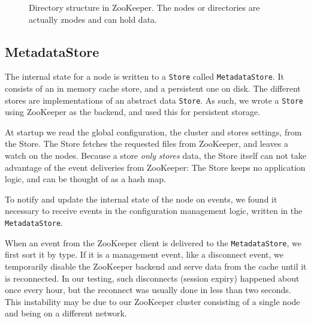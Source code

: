\begin{figure}[h]
\caption{Directory structure in ZooKeeper. The nodes or directories are actually znodes and can hold data.}
\label{fig:dirstruct}
\end{figure}

\subsection{MetadataStore}
The internal state for a node is written to a \texttt{Store} called \texttt{MetadataStore}. It consists of an in memory cache store, and a persistent one on disk. The different stores are implementations of an abstract data \texttt{Store}. As such, we wrote a \texttt{Store} using ZooKeeper as the backend, and used this for persistent storage.

At startup we read the global configuration, the cluster and stores settings, from the Store. The Store fetches the requested files from ZooKeeper, and leaves a watch on the nodes. Because a store \emph{only} \emph{stores} data, the Store itself can not take advantage of the event deliveries from ZooKeeper: The Store keeps no application logic, and can be thought of as a hash map.

To notify and update the internal state of the node on events, we found it necessary to receive events in the configuration management logic, written in the \texttt{MetadataStore}.

When an event from the ZooKeeper client is delivered to the \texttt{MetadataStore}, we first sort it by type.
If it is a management event, like a disconnect event, we temporarily disable the ZooKeeper backend and serve data from the cache until it is reconnected. In our testing, such disconnects (session expiry) happened about once every hour, but the reconnect was usually done in less than two seconds. This instability may be due to our ZooKeeper cluster consisting of a single node and being on a different network.

